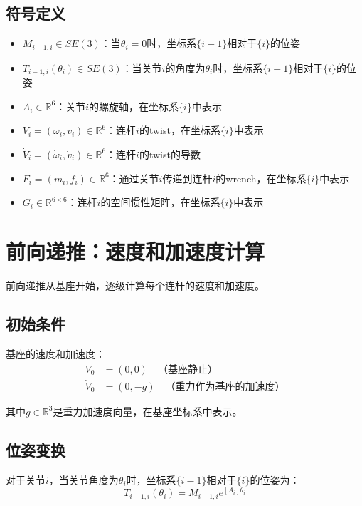 \documentclass[12pt,a4paper]{article}
\begin{document}
\subsection{符号定义}

\begin{itemize}
\item $M_{i-1,i} \in SE(3)$：当$\theta_i = 0$时，坐标系$\{i-1\}$相对于$\{i\}$的位姿
\item $T_{i-1,i}(\theta_i) \in SE(3)$：当关节$i$的角度为$\theta_i$时，坐标系$\{i-1\}$相对于$\{i\}$的位姿
\item $A_i \in \mathbb{R}^6$：关节$i$的螺旋轴，在坐标系$\{i\}$中表示
\item $V_i = (\omega_i, v_i) \in \mathbb{R}^6$：连杆$i$的twist，在坐标系$\{i\}$中表示
\item $\dot{V}_i = (\dot{\omega}_i, \dot{v}_i) \in \mathbb{R}^6$：连杆$i$的twist的导数
\item $F_i = (m_i, f_i) \in \mathbb{R}^6$：通过关节$i$传递到连杆$i$的wrench，在坐标系$\{i\}$中表示
\item $G_i \in \mathbb{R}^{6 \times 6}$：连杆$i$的空间惯性矩阵，在坐标系$\{i\}$中表示
\end{itemize}

\section{前向递推：速度和加速度计算}

前向递推从基座开始，逐级计算每个连杆的速度和加速度。

\subsection{初始条件}

基座的速度和加速度：
\begin{align}
V_0 &= (0, 0) \quad \text{（基座静止）} \\
\dot{V}_0 &= (0, -g) \quad \text{（重力作为基座的加速度）}
\end{align}

其中$g \in \mathbb{R}^3$是重力加速度向量，在基座坐标系中表示。

\subsection{位姿变换}

对于关节$i$，当关节角度为$\theta_i$时，坐标系$\{i-1\}$相对于$\{i\}$的位姿为：
\begin{equation}
T_{i-1,i}(\theta_i) = M_{i-1,i} e^{[A_i]\theta_i}
\label{eq:pose_transform}
\end{equation}
\end{document}
